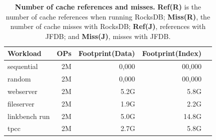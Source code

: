 \iffalse
\begin{table}
    \centering
    \fontsize{11}{11}
    \begin{tabular}{| l | r | r | r | r | } %
    \hline
    \footnotesize{\textbf{Workload}} & \footnotesize{\textbf{OPs}} & \footnotesize{\textbf{Footprint(Data)}} & \footnotesize{\textbf{Footprint(Index)}} \\ \hline \hline
    \footnotesize{sequential} & \footnotesize{2M} & \footnotesize{0,000} & \footnotesize{00,000} \\ \hline
    \footnotesize{random} & \footnotesize{2M} & \footnotesize{0,000} & \footnotesize{00,000} \\ \hline
    \footnotesize{webserver} & \footnotesize{2M} & \footnotesize{5.2G} & \footnotesize{5.8G} \\ \hline
    \footnotesize{fileserver} & \footnotesize{2M} & \footnotesize{1.9G} & \footnotesize{2.2G} \\ \hline
    \footnotesize{linkbench run} & \footnotesize{2M} & \footnotesize{5.0G} & \footnotesize{14.8G} \\ \hline
    \footnotesize{tpcc} & \footnotesize{2M} & \footnotesize{2.7G} & \footnotesize{5.8G} \\ \hline
    \end{tabular}
    \vspace{5pt}
    \caption{\textbf{Number of cache references and misses.}
        \textbf{Ref(R)} is the number of cache references when running RocksDB; 
        \textbf{Miss(R)}, the number of cache misses with RocksDB; 
        \textbf{Ref(J)}, references with JFDB; and \textbf{Miss(J)}, misses with JFDB.
    }    
    \label{tab_cache_miss}
\end{table}
